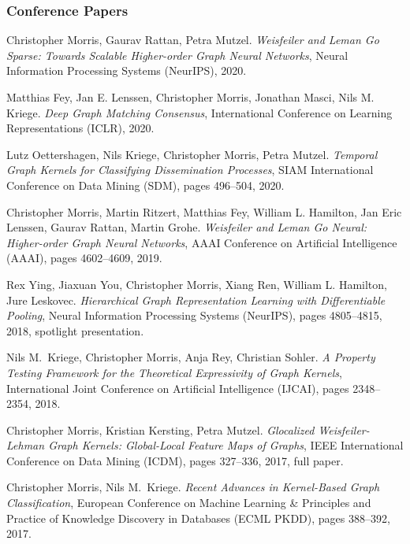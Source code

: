 \documentclass[11pt, a4paper, DIV=12]{scrartcl}
\begin{document}
\begin{thebibliography}{5}
\subsubsection*{Conference Papers}
    Christopher Morris, Gaurav Rattan, Petra Mutzel.
\emph{Weisfeiler and Leman Go Sparse: Towards Scalable Higher-order Graph Neural Networks},
Neural Information Processing Systems (NeurIPS), 2020.

	Matthias Fey, Jan E. Lenssen, Christopher Morris, Jonathan Masci, Nils M. Kriege.
    \emph{Deep Graph Matching Consensus},
	International Conference on Learning Representations (ICLR), 2020.
	
	Lutz Oettershagen, Nils Kriege, Christopher Morris, Petra Mutzel.
	\emph{Temporal Graph Kernels for Classifying Dissemination Processes},
	SIAM International Conference on Data Mining (SDM), pages 496--504, 2020.
	
	Christopher Morris, Martin Ritzert, Matthias Fey, William L. Hamilton, Jan Eric Lenssen, Gaurav Rattan, Martin Grohe.
	\newblock \emph{Weisfeiler and Leman Go Neural: Higher-order Graph Neural Networks},
	\newblock AAAI Conference on Artificial Intelligence (AAAI), pages 4602--4609, 2019.
	
	Rex Ying, Jiaxuan You, Christopher Morris, Xiang Ren, William L. Hamilton, Jure Leskovec.
	\emph{Hierarchical Graph Representation Learning with Differentiable Pooling},
	Neural Information Processing Systems (NeurIPS), pages 4805--4815, 2018, spotlight presentation.
	
	Nils M.~Kriege, Christopher Morris, Anja Rey, Christian Sohler.
	\emph{A Property Testing Framework for the Theoretical Expressivity of Graph Kernels},
	International Joint Conference on Artificial Intelligence (IJCAI), pages 2348--2354, 2018.
	
    Christopher Morris, Kristian Kersting, Petra Mutzel.
	\emph{Glocalized Weisfeiler-Lehman Graph Kernels: Global-Local Feature Maps of Graphs},
	IEEE International Conference on Data Mining (ICDM), pages 327--336, 2017, full paper.
	
	Christopher Morris, Nils M.~Kriege.
	\emph{Recent Advances in Kernel-Based Graph Classification},
	European Conference on Machine Learning \& Principles and Practice of Knowledge Discovery in Databases (ECML PKDD), pages 388--392, 2017.
	

\end{thebibliography}
\end{document}
